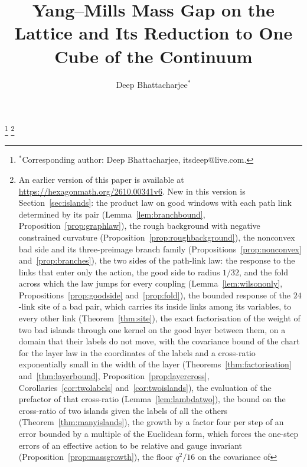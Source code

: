 \documentclass[11pt]{amsart}
\theoremstyle{definition}
\theoremstyle{remark}
\numberwithin{equation}{section}
\begin{document}
\title[Yang--Mills mass gap and its reduction to one cube]{Yang--Mills Mass Gap on the Lattice and Its Reduction to One Cube of the Continuum}

\author[D. Bhattacharjee]{Deep Bhattacharjee$^{*}$}
\address{Formerly, Electro-Gravitational Space Propulsion Laboratory
(EGSPL), Bhubaneswar, Odisha 751030, India; formerly, University of Calcutta (Heramba Chandra College), 23/49 Gariahat
Road, Golpark, Kolkata 700029, West Bengal, India}
\thanks{$^{*}$Corresponding author: Deep Bhattacharjee, itsdeep@live.com.}
\thanks{\scriptsize An earlier version of this paper is available at
\url{https://hexagonmath.org/2610.00341v6}. New in this version is
Section~\ref{sec:islands}: the product law on good windows with each path link
determined by its pair (Lemma~\ref{lem:branchbound},
Proposition~\ref{prop:graphlaw}), the rough background with negative
constrained curvature (Proposition~\ref{prop:roughbackground}), the
nonconvex bad side and its three-preimage branch family
(Propositions~\ref{prop:nonconvex} and~\ref{prop:branches}), the two sides
of the path-link law: the response to the links that enter only the
action, the good side to radius $1/32$, and the fold across which the law
jumps for every coupling (Lemma~\ref{lem:wilsononly},
Propositions~\ref{prop:goodside} and~\ref{prop:fold}), the bounded response of the $24$-link site of a bad pair, which carries its inside links among its variables, to every other link (Theorem~\ref{thm:site}), the exact factorisation of the weight of two bad islands through one kernel on the good layer between them, on a domain that their labels do not move, with the covariance bound of the chart for the layer law in the coordinates of the labels and a cross-ratio exponentially small in the width of the layer (Theorems~\ref{thm:factorisation} and~\ref{thm:layerbound}, Proposition~\ref{prop:layercross}, Corollaries~\ref{cor:twolabels} and~\ref{cor:twoislands}), the evaluation of the prefactor of that cross-ratio (Lemma~\ref{lem:lambdatwo}), the bound on the cross-ratio of two islands given the labels of all the others (Theorem~\ref{thm:manyislands}), the growth by a factor four per step of an error bounded by a multiple of the Euclidean form, which forces the one-step errors of an effective action to be relative and gauge invariant (Proposition~\ref{prop:massgrowth}), the floor $q^2/16$ on the covariance of
}
\end{document}

